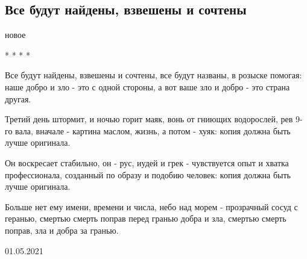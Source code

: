  
 
 
 
 

\subsection{Все будут найдены, взвешены и сочтены}

новое

* * * *

Все будут найдены, взвешены и сочтены,
все будут названы, в розыске помогая:
наше добро и зло - это с одной стороны,
а вот ваше зло и добро - это страна другая.

Третий день штормит, и ночью горит маяк,
вонь от гниющих водорослей, рев 9-го вала,
вначале - картина маслом, жизнь, а потом - хуяк:
копия должна быть лучше оригинала.

Он воскресает стабильно, он - рус, иудей и грек -
чувствуется опыт и хватка профессионала,
созданный по образу и подобию человек:
копия должна быть лучше оригинала.

Больше нет ему имени, времени и числа,
небо над морем - прозрачный сосуд с геранью,
смертью смерть поправ перед гранью добра и зла,
смертью смерть поправ, зла и добра за гранью.

01.05.2021

